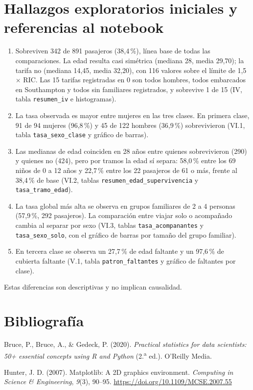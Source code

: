 \documentclass[11pt,letterpaper]{article}
\begin{document}
\section{Hallazgos exploratorios iniciales y referencias al notebook}
\begin{enumerate}[nosep,leftmargin=*]
\item Sobreviven 342 de 891 pasajeros (38,4\,\%), línea base de todas las comparaciones. La edad resulta casi simétrica (mediana 28, media 29,70); la tarifa no (mediana 14,45, media 32,20), con 116 valores sobre el límite de 1,5 × RIC. Las 15 tarifas registradas en 0 son todos hombres, todos embarcados en Southampton y todos sin familiares registrados, y sobrevive 1 de 15 (IV, tabla \texttt{resumen\_iv} e histogramas).
\item La tasa observada es mayor entre mujeres en las tres clases. En primera clase, 91 de 94 mujeres (96,8\,\%) y 45 de 122 hombres (36,9\,\%) sobrevivieron (VI.1, tabla \texttt{tasa\_sexo\_clase} y gráfico de barras).
\item Las medianas de edad coinciden en 28 años entre quienes sobrevivieron (290) y quienes no (424), pero por tramos la edad sí separa: 58,0\,\% entre los 69 niños de 0 a 12 años y 22,7\,\% entre los 22 pasajeros de 61 o más, frente al 38,4\,\% de base (VI.2, tablas \texttt{resumen\_edad\_supervivencia} y \texttt{tasa\_tramo\_edad}).
\item La tasa global más alta se observa en grupos familiares de 2 a 4 personas (57,9\,\%, 292 pasajeros). La comparación entre viajar solo o acompañado cambia al separar por sexo (VI.3, tablas \texttt{tasa\_acompanantes} y \texttt{tasa\_sexo\_solo}, con el gráfico de barras por tamaño del grupo familiar).
\item En tercera clase se observa un 27,7\,\% de edad faltante y un 97,6\,\% de cubierta faltante (V.1, tabla \texttt{patron\_faltantes} y gráfico de faltantes por clase).
\end{enumerate}
Estas diferencias son descriptivas y no implican causalidad.

\section{Bibliografía}
\begingroup\small\setlength{\parindent}{-1.27cm}
Bruce, P., Bruce, A., \& Gedeck, P. (2020). \textit{Practical statistics for data scientists: 50+ essential concepts using R and Python} (2.\textsuperscript{a} ed.). O'Reilly Media.

Hunter, J. D. (2007). Matplotlib: A 2D graphics environment. \textit{Computing in Science \& Engineering}, \textit{9}(3), 90--95. \url{https://doi.org/10.1109/MCSE.2007.55}
\end{document}
